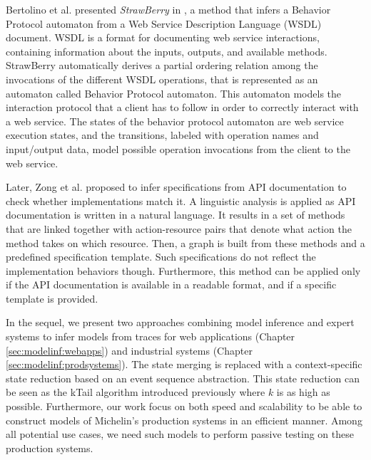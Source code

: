 Bertolino et al. presented \textit{StrawBerry} in
\cite{Bertolino:2009:ASB:1595696.1595719}, a method that infers a
Behavior Protocol automaton from a Web Service Description
Language (WSDL) document.  WSDL is a format for documenting web
service interactions, containing information about the inputs,
outputs, and available methods. StrawBerry automatically derives a
partial ordering relation among the invocations of the different
WSDL operations, that is represented as an automaton called
Behavior Protocol automaton.  This automaton models the
interaction protocol that a client has to follow in order to
correctly interact with a web service.  The states of the
behavior protocol automaton are web service execution states, and
the transitions, labeled with operation names and input/output
data, model possible operation invocations from the client to the
web service.

Later, Zong et al. \cite{ZhongZXM11} proposed to infer
specifications from API documentation to check whether
implementations match it. A linguistic analysis is applied as API
documentation is written in a natural language. It results in a
set of methods that are linked together with action-resource
pairs that denote what action the method takes on which resource.
Then, a graph is built from these methods and a predefined
specification template. Such specifications do not reflect the
implementation behaviors though. Furthermore, this method can be
applied only if the API documentation is available in a readable
format, and if a specific template is provided.

In the sequel, we present two approaches combining model
inference and expert systems to infer models from traces for web
applications (Chapter \ref{sec:modelinf:webapps}) and industrial
systems (Chapter \ref{sec:modelinf:prodsystems}). The state
merging is replaced with a context-specific state reduction based
on an event sequence abstraction. This state reduction can be
seen as the kTail algorithm introduced previously where $k$ is as
high as possible. Furthermore, our work focus on both speed and
scalability to be able to construct models of Michelin's
production systems in an efficient manner. Among all potential
use cases, we need such models to perform passive testing on
these production systems.
